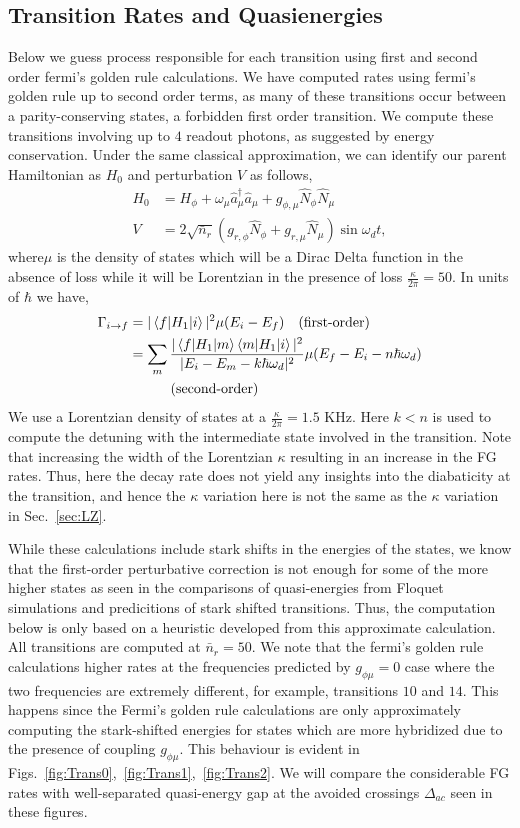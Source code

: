 \documentclass[%
reprint,
superscriptaddress,
 amsmath,amssymb,
 aps,
 prx,
longbibliography,
floatfix,
]{revtex4-2}
\begin{document}
\subsection{Transition Rates and Quasienergies}\label{app:Floquet-trans}
Below we guess process responsible for each transition using first and second order fermi's golden rule calculations. We have computed rates using fermi's golden rule up to second order terms, as many of these transitions occur between a parity-conserving states, a forbidden first order transition. We compute these transitions involving up to $4$ readout photons, as suggested by energy conservation. 
Under the same classical approximation, we can identify our parent Hamiltonian as $H_0$ and perturbation $V$ as follows,
\begin{align}
H_0&=H_{\phi}+\omega_\mu \hat a_\mu^\dagger \hat a_\mu+g_{\phi,\mu}\hat N_\phi \hat N_\mu\\
V&=2\sqrt{\bar n_r}(g_{r,\phi} \hat N_\phi+g_{r,\mu}\hat N_\mu)\sin{\omega_d t},
\end{align}
where$\mu$ is the density of states which will be a Dirac Delta function in the absence of loss while it will be Lorentzian in the presence of loss $\frac{\kappa}{2\pi}=50$. In units of $\hbar$ we have,
\begin{align}
    \Gamma_{i\rightarrow f}&=|\braket{f|H_1|i}|^2\mu(E_i-E_f)\quad\textrm{(first-order)}\\
&=\sum_m\frac{|\braket{f|H_1|m}\braket{m|H_1|i}|^2}{|E_i-E_m-k\hbar\omega_d|^2}\mu(E_f-E_i-n\hbar \omega_d)\nonumber\\&\quad\quad\quad\textrm{(second-order)}
\end{align}
We use a Lorentzian density of states at a $\frac{\kappa}{2\pi}=1.5$ KHz. Here $k<n$ is used to compute the detuning with the intermediate state involved in the transition. Note that increasing the width of the Lorentzian $\kappa$ resulting in an increase in the FG rates. Thus, here the decay rate does not yield any insights into the diabaticity at the transition, and hence the $\kappa$ variation here is not the same as the $\kappa$ variation in Sec.~\ref{sec:LZ}.

While these calculations include stark shifts in the energies of the states, we know that the first-order perturbative correction is not enough for some of the more higher states as seen in the comparisons of quasi-energies from Floquet simulations and predicitions of stark shifted transitions. Thus, the computation below is only based on a heuristic developed from this approximate calculation. All transitions are computed at $\bar n_r=50$. We note that the fermi's golden rule calculations higher rates at the frequencies predicted by $g_{\phi\mu}=0$ case where the two frequencies are extremely different, for example, transitions $10$ and $14$. This happens since the Fermi's golden rule calculations are only approximately computing the stark-shifted energies for states which are more hybridized due to the presence of coupling $g_{\phi\mu}$. This behaviour is evident in Figs.~\ref{fig:Trans0},~\ref{fig:Trans1},~\ref{fig:Trans2}. We will compare the considerable FG rates with well-separated quasi-energy gap at the avoided crossings  $\Delta_{ac}$ seen in these figures.
\end{document}
